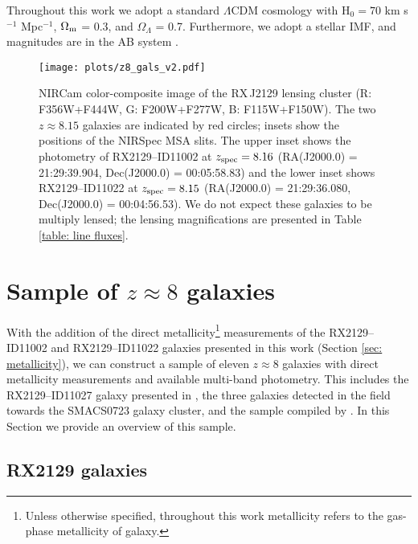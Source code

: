 \documentclass[twocolumn]{aastex631}
\newcommand\titlelowercase[1]{\texorpdfstring{\lowercase{#1}}{#1}}
\begin{document}
Throughout this work we adopt a standard $\Lambda$CDM cosmology with H$_{0} = 70$ km s$^{-1}$ Mpc$^{-1}$, $\Omega_\textnormal{m}$ = 0.3, and $\Omega_{\Lambda}$ = 0.7. Furthermore, we adopt a \cite{chabrier+2003} stellar IMF, and magnitudes are in the AB system \citep{1983ApJ...266..713O}. 


\begin{figure*}
    \centering
    \texttt{[image: plots/z8\_gals\_v2.pdf]}
    \caption{NIRCam color-composite image of the RX\,J2129 lensing cluster (R: F356W+F444W, G: F200W+F277W, B: F115W+F150W). The two $z \approx 8.15$ galaxies are indicated by red circles; insets show the positions of the NIRSpec MSA slits. The upper inset shows the photometry of RX2129--ID11002 at $z_{\textnormal{spec}} = 8.16$ (RA(J2000.0) = 21:29:39.904, Dec(J2000.0) = 00:05:58.83) and the lower inset shows RX2129--ID11022 at $z_{\textnormal{spec}} = 8.15$ (RA(J2000.0) = 21:29:36.080, Dec(J2000.0) = 00:04:56.53). We do not expect these galaxies to be multiply lensed; the lensing magnifications are presented in Table \ref{table: line fluxes}.}
    \label{fig: photometry}
\end{figure*}

\section{Sample \titlelowercase{of $z \approx 8$} galaxies} \label{sec: sample}

With the addition of the direct metallicity\footnote{Unless otherwise specified, throughout this work metallicity refers to the gas-phase metallicity of galaxy.} measurements of the RX2129--ID11002 and RX2129--ID11022 galaxies presented in this work (Section \ref{sec: metallicity}), we can construct a sample of eleven $z \approx 8$ galaxies with direct metallicity measurements and available multi-band photometry. This includes the RX2129--ID11027 galaxy presented in \cite{williams+2022}, the three galaxies detected in the field towards the SMACS0723 galaxy cluster, and the sample compiled by \cite{jones+2020}. In this Section we provide an overview of this sample. 


\subsection{RX2129 galaxies}
\end{document}
